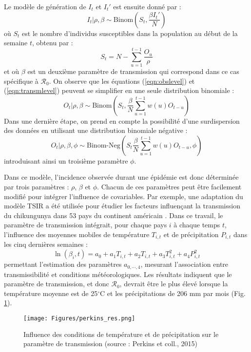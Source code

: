 Le modèle de génération de $I_t$ et $I_t'$ est ensuite donné par :
\begin{equation}
\label{eqn:transmlevel} 
I_t|\rho,\beta \sim \text{Binom}\left(S_t,\frac{\beta I_t'}{N}\right)
\end{equation}
où $S_t$ est le nombre d'individus susceptibles dans la population au début de la semaine $t$, obtenu par :
\begin{equation}
S_t = N-\sum_{u=1}^{t-1} \frac{O_u}{\rho}
\end{equation}
et où $\beta$ est un deuxième paramètre de transmission qui correspond dans ce cas spécifique à $\mathcal{R}_0$. 
On observe que les équations (\ref{eqn:obslevel}) et (\ref{eqn:transmlevel}) peuvent se simplifier en une seule distribution binomiale :
\begin{equation} 
O_t|\rho,\beta \sim \text{Binom}\left(S_t,\frac{\beta}{N} \sum_{u=1}^{t-1} w(u) O_{t-u}\right)
\end{equation}
Dans une dernière étape, on prend en compte la possibilité d'une surdispersion des données en utilisant une distribution binomiale négative :
\begin{equation} 
O_t|\rho,\beta,\phi \sim \text{Binom-Neg}\left(S_t\frac{\beta}{N} \sum_{u=1}^{t-1} w(u) O_{t-u}, \phi \right)
\end{equation}
introduisant ainsi un troisième paramètre $\phi$.

Dans ce modèle, l'incidence observée durant une épidémie est donc déterminée par trois paramètres : $\rho$, $\beta$ et $\phi$.
Chacun de ces paramètres peut être facilement modifié pour intégrer l'influence de covariables.
Par exemple, une adaptation du modèle TSIR a été utilisée pour étudier les facteurs influençant la transmission du chikungunya dans 53 pays du continent américain \cite{perkins_estimating_2015}.
Dans ce travail, le paramètre de transmission intégrait, pour chaque pays $i$ à chaque temps $t$, l'influence des moyennes mobiles de température $T_{i,t}$ et de précipitation $P_{i,t}$ dans les cinq dernières semaines :
\begin{equation}
\ln(\beta_i,t) = a_0 + a_1T_{i,t} + a_2T_{i,t} + a_3T_{i,t}^2 + a_4P_{i,t}^2
\end{equation}
permettant l'estimation des paramètres $a_{0,\cdots,4}$, mesurant l'association entre transmissibilité et conditions météorologiques.
Les résultats indiquent que le paramètre de transmission, et donc $\mathcal{R}_0$, devrait être le plus élevé lorsque la température moyenne est de 25$^{\circ}$C et les précipitations de 206 mm par mois (Fig. \ref{fig:perkins_res}).
\begin{figure}[t]
	\centering
	\texttt{[image: Figures/perkins\_res.png]}
	\caption{Influence des conditions de température et de précipitation sur le paramètre de transmission  (source : Perkins et coll., 2015)}
	\label{fig:perkins_res}
\end{figure}
